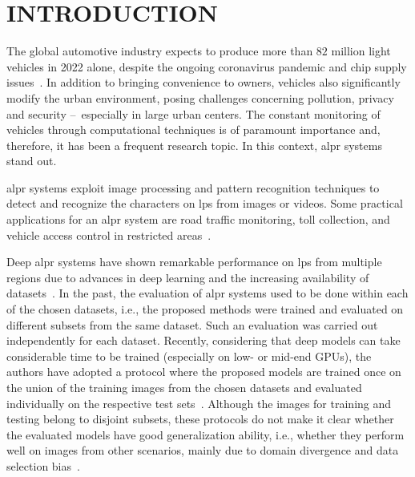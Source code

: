 \section{\uppercase{Introduction}}
\label{sec:introduction}

\glsresetall

The global automotive industry expects to produce more than $82$ million light vehicles in 2022 alone, despite the ongoing coronavirus pandemic and chip supply issues~\citep{news2021forbes,news2021ihsmarkit}.
In addition to bringing convenience to owners, vehicles also significantly modify the urban environment, posing challenges concerning pollution, privacy and security --~especially in large urban centers.
The constant monitoring of vehicles through computational techniques is of paramount importance and, therefore, it has been a frequent research topic.
In this context, \gls*{alpr} systems~\citep{weihong2020research,lubna2021automatic} stand out.%
\ifscitepress
\else
{}
\fi


\gls*{alpr} systems exploit image processing and pattern recognition techniques to detect and recognize the characters on \glspl*{lp} from images or videos.
Some practical applications for an \gls*{alpr} system are road traffic monitoring, toll collection, and vehicle access control in restricted areas~\citep{spanhel2017holistic,henry2020multinational,wang2022rethinking}.

Deep \gls*{alpr} systems have shown remarkable performance on \glspl*{lp} from multiple regions due to advances in deep learning and the increasing availability of datasets~\citep{henry2020multinational,silva2022flexible}.
In the past, the evaluation of \gls*{alpr} systems used to be done within each of the chosen datasets, i.e., the proposed methods were trained and evaluated on different subsets from the same dataset.
Such an evaluation was carried out independently for each dataset.
Recently, considering that deep models can take considerable time to be trained (especially on low- or mid-end GPUs), the authors have adopted a protocol where the proposed models are trained once on the union of the training images from the chosen datasets and evaluated individually on the respective test sets~\citep{selmi2020delpdar,laroca2021efficient}.
Although the images for training and testing belong to disjoint subsets, these protocols do not make it clear whether the evaluated models have good generalization ability, i.e., whether they perform well on images from other scenarios, mainly due to domain divergence and data selection bias~\citep{torralba2011unbiased,tommasi2017deeper,zhang2019recent}.


